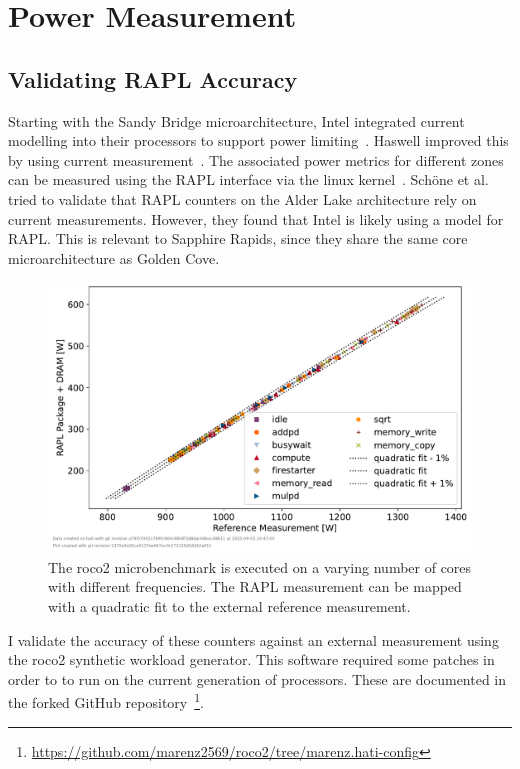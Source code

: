 \chapter{Power Measurement}
\label{sec:power_measurement}

\section{Validating RAPL Accuracy}
\label{sec:validating_rapl_accuracy}
Starting with the Sandy Bridge microarchitecture, Intel integrated current modelling into their processors to support power limiting~\cite{Hackenberg_2013_RAPL_APM}.
Haswell improved this by using current measurement~\cite{Hackenberg_2015_Haswell}.
The associated power metrics for different zones can be measured using the \ac{RAPL} interface via the linux kernel~\cite{powercap_kernel_doc}.
Schöne et al.~\cite{Schoene_2024_Alder_Lake} tried to validate that \ac{RAPL} counters on the Alder Lake architecture rely on current measurements.
However, they found that Intel is likely using a model for \ac{RAPL}.
This is relevant to Sapphire Rapids, since they share the same core microarchitecture as Golden Cove.

\begin{figure}[]
    \centering
    \includegraphics[width=0.8\columnwidth]{fig/rapl-accuracy/rapl-accuracy.pdf}
    \caption{\label{fig:validate-rapl}The roco2 microbenchmark is executed on a varying number of cores with different frequencies.
    The \ac{RAPL} measurement can be mapped with a quadratic fit to the external reference measurement.}
\end{figure}

I validate the accuracy of these counters against an external measurement using the roco2 synthetic workload generator.
This software required some patches in order to to run on the current generation of processors.
These are documented in the forked GitHub repository~\footnote{\url{https://github.com/marenz2569/roco2/tree/marenz.hati-config}}.

